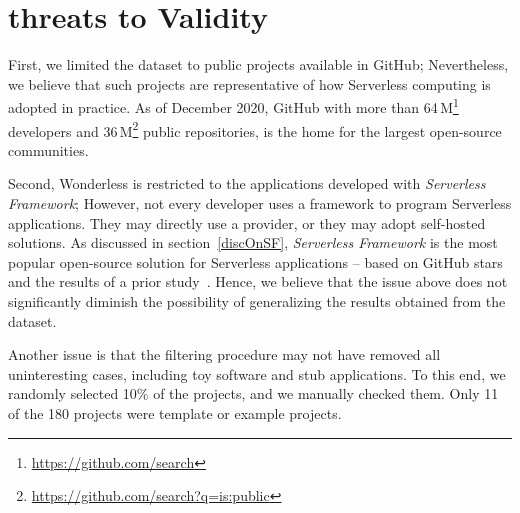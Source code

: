 \section{threats to Validity}
\label{limitations}

%

First, we limited the dataset to public projects available in GitHub; 
Nevertheless, we believe that such projects are representative of 
how Serverless computing is adopted in practice.
As of December 2020, 
GitHub with more than 64\,M\footnote{\url{https://github.com/search}} 
developers and 36\,M\footnote{\url{https://github.com/search?q=is:public}} public 
repositories, is the home for the largest open-source communities. 
%

Second, Wonderless is restricted to the applications 
developed with \emph{Serverless Framework}; 
However, not every developer uses a framework to program Serverless applications. 
They may directly use a provider, or they may adopt self-hosted solutions. 
%
As discussed in section~\ref{discOnSF}, \emph{Serverless Framework} is the 
most popular open-source solution for Serverless applications -- 
based on GitHub stars and the results of a prior study~\cite{kritikos2018review}. 
Hence, we believe that the issue above does not significantly diminish 
the possibility of generalizing the results obtained from the dataset.

Another issue is that the filtering procedure may not have removed all 
uninteresting cases, including toy software and stub applications.
To this end, we randomly selected 10\% of the projects, 
and we manually checked them. 
Only 11 of the 180 projects were template or example projects.









